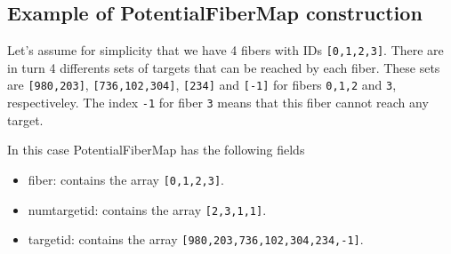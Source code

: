 \documentclass{article}
\begin{document}
\subsection{Example of PotentialFiberMap construction}
Let's assume for simplicity that we have 4 fibers with IDs
\texttt{[0,1,2,3]}. There are in turn 4 differents sets of targets that
can be reached by each fiber. These sets are \texttt{[980,203]},
\texttt{[736,102,304]}, \texttt{[234]} and \texttt{[-1]} for fibers
\texttt{0,1,2} and \texttt{3}, respectiveley.
The index \texttt{-1} for fiber \texttt{3} means that this fiber
cannot reach any target.

In this case PotentialFiberMap has the following fields
\begin{itemize}
\item
fiber: contains the array \texttt{[0,1,2,3]}.
\item
numtargetid: contains the array \texttt{[2,3,1,1]}.
\item
targetid: contains the array \texttt{[980,203,736,102,304,234,-1]}.

\end{itemize}
\end{document}
